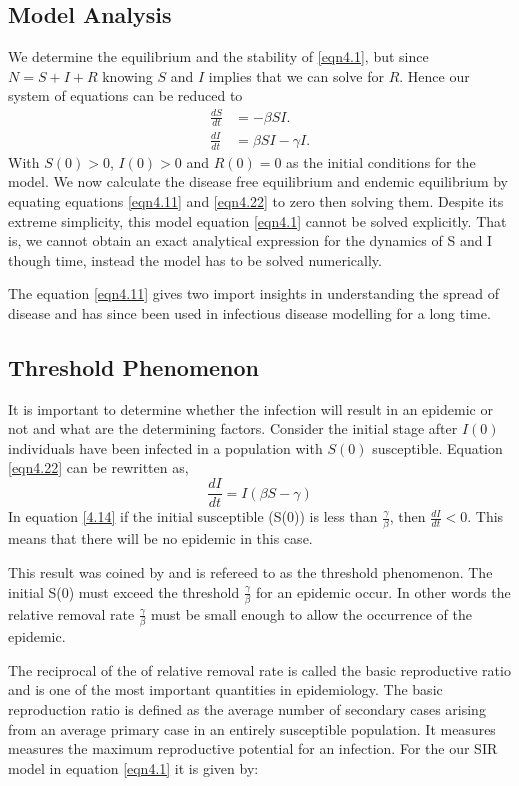 \subsection{Model Analysis}
We determine the equilibrium and the stability of \ref{eqn4.1}, but since $N =S + I + R$ knowing $S$ and $I$ implies that we can solve for  $R$. Hence our system of equations can be reduced to 
\begin{align}
\frac{dS}{dt} &=-\beta SI. \label{eqn4.11} \\
 \frac{dI}{dt} &= \beta S I - \gamma  I \label{eqn4.22}.
\end{align}
 With $S(0) >0$, $I(0) > 0$ and $R(0) =0$ as the initial conditions for the model.
 We now calculate the disease free equilibrium and endemic equilibrium by equating equations \ref{eqn4.11} and \ref{eqn4.22} to zero then solving them. Despite its extreme simplicity, this model equation \ref{eqn4.1} cannot be solved explicitly. That is, we cannot obtain an exact analytical expression for the dynamics of S and I
though time, instead the model has to be solved numerically.

The equation \ref{eqn4.11} gives two import insights in understanding the spread of disease and has since been used in infectious disease modelling for a long time.

\subsection{Threshold Phenomenon} 
It is important to determine whether the infection will result in an epidemic or not and what are the determining factors. Consider the initial stage after $I (0) $ individuals have been infected in a population with $S (0) $ susceptible. Equation \ref{eqn4.22} can be rewritten as,
\begin{equation} 
\frac{dI}{dt} = I \left(\beta S -\gamma \right)\label{4.14}
\end{equation}
In equation \ref{4.14} if the initial susceptible (S(0)) is less than $\frac{\gamma}{\beta}$, then $\frac{dI}{dt} < 0 $. This means that there will be no epidemic in this case.

This result was coined by \cite{m1925applications} and  is refereed to as the threshold phenomenon. The initial S(0) must exceed the threshold $\frac{\gamma}{\beta}$ for an epidemic occur. In  other words the relative removal rate $\frac{\gamma}{\beta}$ must be small enough to allow the occurrence  of the epidemic.
 
 The reciprocal of the of relative removal rate is called the basic reproductive ratio and is one of the most important quantities in epidemiology. The basic reproduction ratio is defined as the average number of secondary cases arising from an average primary case in an entirely susceptible population. It measures measures the maximum reproductive potential for an infection. For the our SIR model in equation \ref{eqn4.1} it is given by:

